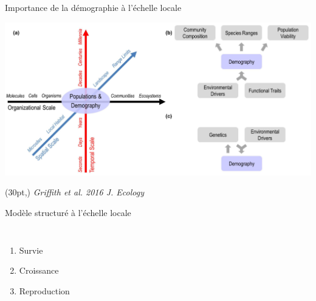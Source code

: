 \documentclass[11pt, compress, aspectratio=1610]{beamer}
\newcommand\smallcitation[1]{%
\begin{textblock*}{\textwidth}(30pt,\textheight)
	\raggedleft \footnotesize\textit{#1}
\end{textblock*}}
\providecommand{\tightlist}{%
  \setlength{\itemsep}{0pt}\setlength{\parskip}{0pt}}
\newcommand{\begincols}{\begin{columns}}
\newcommand{\stopcols}{\end{columns}}
\begin{document}
\begin{frame}{Importance de la démographie à l'échelle locale}

\centering
 \includegraphics[scale=0.32]{figures/Griffith2016.png}\par

\smallcitation{Griffith et al. 2016 J. Ecology}

\end{frame}

\begin{frame}{Modèle structuré à l'échelle locale}

\begincols
{}

\begin{enumerate}
    \def\labelenumi{\arabic{enumi}.}
    \tightlist
    \item
      Survie
    \item
      Croissance
    \item
      Reproduction
  \end{enumerate}

\hfill{} \stopcols

\end{frame}
\end{document}
